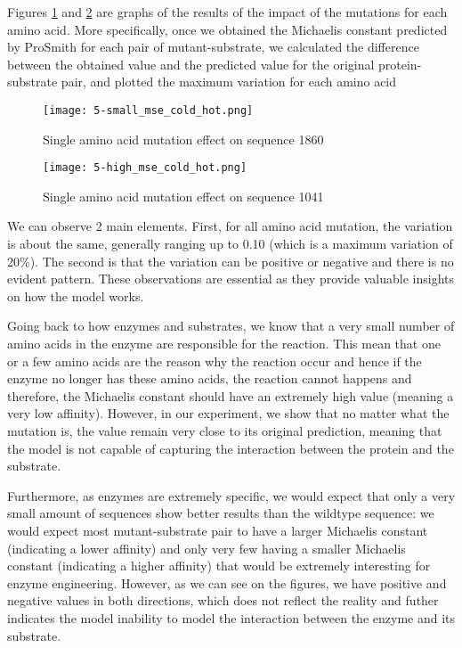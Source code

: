 Figures \ref{fig:seq1860} and \ref{fig:seq1866} are graphs of the results of the impact of the mutations for
each amino acid. More specifically, once we obtained the Michaelis constant predicted by ProSmith for each 
pair of mutant-substrate, we calculated the difference between the obtained value and the predicted value for the
original protein-substrate pair, and plotted the maximum variation for each amino acid

\begin{figure}
    \centering
    \texttt{[image: 5-small\_mse\_cold\_hot.png]}
    \caption{Single amino acid mutation effect on sequence 1860}
    \label{fig:seq1860}
  \end{figure}

\begin{figure}
    \centering
    \texttt{[image: 5-high\_mse\_cold\_hot.png]}
    \caption{Single amino acid mutation effect on sequence 1041}
    \label{fig:seq1866}
  \end{figure}

We can observe 2 main elements. First, for all amino acid mutation, the variation is about the same, generally
ranging up to 0.10 (which is a maximum variation of 20\%). The second is that the variation can be positive
or negative and there is no evident pattern. These observations are essential as they provide valuable 
insights on how the model works. 

Going back to how enzymes and substrates, we know that a very small number of amino acids in the enzyme
are responsible for the reaction. This mean that one or a few amino acids are the reason why the reaction occur
and hence if the enzyme no longer has these amino acids, the reaction cannot happens and therefore, the Michaelis
constant should have an extremely high value (meaning a very low affinity). However, in our experiment, we show
that no matter what the mutation is, the value remain very close to its original prediction, meaning that the
model is not capable of capturing the interaction between the protein and the substrate.

Furthermore, as enzymes are extremely specific, we would expect that only a very small amount of sequences
show better results than the wildtype sequence: we would expect most mutant-substrate pair to have a larger
Michaelis constant (indicating a lower affinity) and only very few having a smaller Michaelis constant 
(indicating a higher affinity) that would be extremely interesting for enzyme engineering. However, as we can
see on the figures, we have positive and negative values in both directions, which does not reflect the 
reality and futher indicates the model inability to model the interaction between the enzyme and its substrate.

